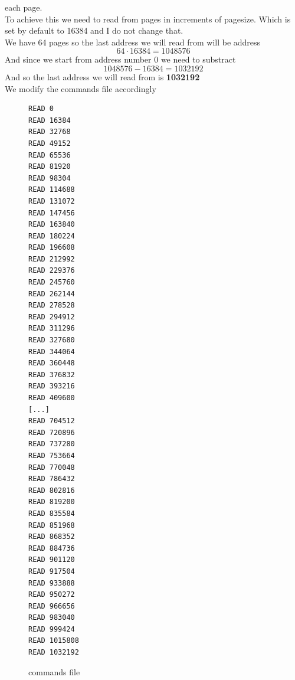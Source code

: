 each page. \\
To achieve this we need to read from pages in increments of pagesize. Which is
set by default to 16384 and I do not change that. \\
We have 64 pages so the last address we will read from will be address 
\[ 64 \cdot 16384 = 1048576 \]
And since we start from address number 0 we need to substract
\[ 1048576 - 16384 = 1032192 \]
And so the last address we will read from is \textbf{1032192} \\
We modify the commands file accordingly
\begin{figure}
	\caption{commands file}
\begin{lstlisting}
READ 0
READ 16384
READ 32768
READ 49152
READ 65536
READ 81920
READ 98304
READ 114688
READ 131072
READ 147456
READ 163840
READ 180224
READ 196608
READ 212992
READ 229376
READ 245760
READ 262144
READ 278528
READ 294912
READ 311296
READ 327680
READ 344064
READ 360448
READ 376832
READ 393216
READ 409600
[...]
READ 704512
READ 720896
READ 737280
READ 753664
READ 770048
READ 786432
READ 802816
READ 819200
READ 835584
READ 851968
READ 868352
READ 884736
READ 901120
READ 917504
READ 933888
READ 950272
READ 966656
READ 983040
READ 999424
READ 1015808
READ 1032192
\end{lstlisting}
\end{figure}
